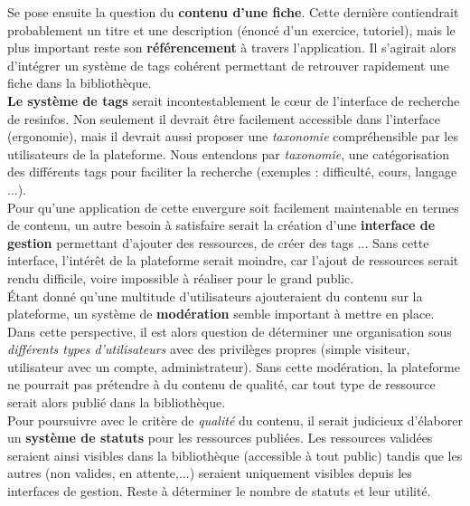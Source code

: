 Se pose ensuite la question du \textbf{contenu d'une \gls{fiche}}. Cette dernière contiendrait probablement un titre et une description (énoncé d'un exercice, tutoriel), mais le plus important reste son \textbf{référencement} à travers l'application. Il s'agirait alors d'intégrer un système de \glspl{tag} cohérent permettant de retrouver rapidement une \gls{fiche} dans la bibliothèque.\\

\textbf{Le système de \glspl{tag}} serait incontestablement le cœur de l'interface de recherche de \glspl{resinfo}. Non seulement il devrait être facilement accessible dans l'interface (ergonomie), mais il devrait aussi proposer une \textit{taxonomie} compréhensible par les utilisateurs de la plateforme. Nous entendons par \textit{taxonomie}, une catégorisation des différents \glspl{tag} pour faciliter la recherche (exemples : difficulté, cours, langage ...).\\

Pour qu'une application de cette envergure soit facilement maintenable en termes de contenu, un autre besoin à satisfaire serait la création d'une \textbf{interface de gestion} permettant d'ajouter des ressources, de créer des \glspl{tag} ... Sans cette interface, l'intérêt de la plateforme serait moindre, car l'ajout de ressources serait rendu difficile, voire impossible à réaliser pour le grand public.\\

Étant donné qu'une multitude d'utilisateurs ajouteraient du contenu sur la plateforme, un système de \textbf{modération} semble important à mettre en place. Dans cette perspective, il est alors question de déterminer une organisation sous \textit{différents types d'utilisateurs} avec des privilèges propres (simple visiteur, utilisateur avec un compte, administrateur). Sans cette modération, la plateforme ne pourrait pas prétendre à du contenu de qualité, car tout type de ressource serait alors publié dans la bibliothèque.\\

Pour poursuivre avec le critère de \textit{qualité} du contenu, il serait judicieux d'élaborer un \textbf{système de statuts} pour les ressources publiées. Les ressources validées seraient ainsi visibles dans la bibliothèque (accessible à tout public) tandis que les autres (non valides, en attente,...) seraient uniquement visibles depuis les interfaces de gestion. Reste à déterminer le nombre de statuts et leur utilité.\\

